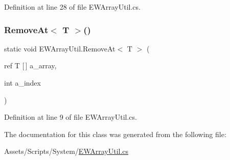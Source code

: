 Definition at line 28 of file E\+W\+Array\+Util.\+cs.

\mbox{\label{class_e_w_array_util_a2e14d8ba3e93e455a84a6a706b8742d4}} 
\subsubsection{\texorpdfstring{Remove\+At$<$ T $>$()}{RemoveAt< T >()}}
{\footnotesize\ttfamily static void E\+W\+Array\+Util.\+Remove\+At$<$ T $>$ (\begin{DoxyParamCaption}\item[{ref T \mbox{[}$\,$\mbox{]}}]{a\+\_\+array,  }\item[{int}]{a\+\_\+index }\end{DoxyParamCaption})\hspace{0.3cm}{\ttfamily [static]}}



Definition at line 9 of file E\+W\+Array\+Util.\+cs.



The documentation for this class was generated from the following file\+:\begin{DoxyCompactItemize}
\item 
Assets/\+Scripts/\+System/\mbox{\hyperlink{_e_w_array_util_8cs}{E\+W\+Array\+Util.\+cs}}\end{DoxyCompactItemize}
